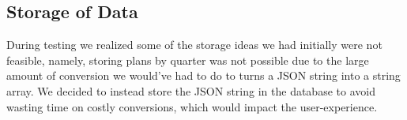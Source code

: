 \documentclass[letterpaper]{report}
\begin{document}
	\subsection{Storage of Data}
	During testing we realized some of the storage ideas we had initially were not feasible, namely, storing plans by quarter was not possible due to the large amount of conversion we would've had to do to turns a JSON string into a string array. We decided to instead store the JSON string in the database to avoid wasting time on costly conversions, which would impact the user-experience. 	
	
\end{document}
